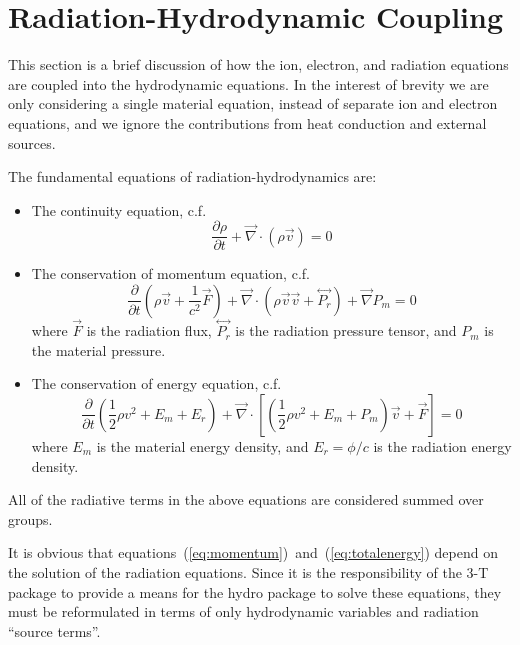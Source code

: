 \documentclass{article}
\newcommand{\partl}[2]{\ensuremath{\frac{\partial{#1}}{\partial{#2}}}}\newcommand{\del}{\ensuremath{\vec{\nabla}}}
\newcommand{\tensor}[1]{\ensuremath{\stackrel{\leftrightarrow}{#1}}}
\begin{document}
\section{Radiation-Hydrodynamic Coupling}

This section is a brief discussion of how the ion, electron, and radiation
equations are coupled into the hydrodynamic equations.
In the interest of brevity we are only considering a single material equation,
instead of separate ion and electron equations, and we ignore the contributions
from heat conduction and external sources.

The fundamental equations of radiation-hydrodynamics are:
\begin{itemize}
  \item The continuity equation, c.f.\ \cite[Eq.~(16)]{PomraningLAUR}
     \begin{equation}
        \partl{\rho}{t} + \del \cdot (\rho \vec{v}) = 0
     \label{eq:continuity}
     \end{equation}
  \item The conservation of momentum equation, c.f.\ \cite[Eq.~(17)]{PomraningLAUR}
     \begin{equation}
        \partl{}{t}\left( \rho \vec{v} + \frac{1}{c^2} \vec{F} \right)
         + \del \cdot \left( \rho \vec{v} \vec{v} + \tensor{P_{r}} \right)
         + \del P_{m}
         = 0
     \label{eq:momentum}
     \end{equation}
     where $\vec{F}$ is the radiation flux,
     $\tensor{P_{r}}$ is the radiation pressure tensor,
     and $P_{m}$ is the material pressure.
  \item The conservation of energy equation,
          c.f.\ \cite[Eq.~(18)]{PomraningLAUR}
     \begin{equation}
        \partl{}{t}\left( \frac{1}{2} \rho v^2
                          + E_{m} + E_{r} \right)
         + \del \cdot \left[
              \left( \frac{1}{2} \rho v^2 + E_{m} + P_{m} \right) \vec{v}
              + \vec{F} \right]
         = 0
     \label{eq:totalenergy}
     \end{equation}
     where $E_{m}$ is the material energy density, and $E_{r} = \phi / c$
     is the radiation energy density.
\end{itemize}
All of the radiative terms in the above equations are considered summed
over groups.

It is obvious that equations~(\ref{eq:momentum})~and~(\ref{eq:totalenergy})
depend on the solution of the radiation equations.
Since it is the responsibility of the 3-T package to provide a means for
the hydro package to solve these equations, they must be reformulated
in terms of only hydrodynamic variables and radiation ``source terms''.
\end{document}
